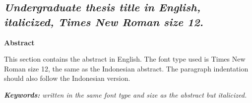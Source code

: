 \begin{singlespace}
\chapter*{\large \textit{Undergraduate thesis title in English, italicized, Times New Roman size 12.}}

\begin{center}
    \textbf{Abstract}
\end{center}
This section contains the abstract in English. The font type used is Times New Roman size 12, the same as the Indonesian abstract. The paragraph indentation should also follow the Indonesian version.

\vspace{0.5cm}
\noindent \textit{\textbf{Keywords:} written in the same font type and size as the abstract but italicized.}
\end{singlespace}
